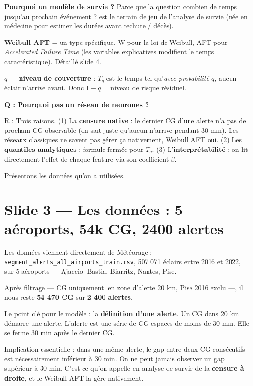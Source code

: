 \documentclass[11pt,a4paper]{article}
\begin{document}
\begin{compr}
\textbf{Pourquoi un modèle de survie ?} Parce que la question \og combien de temps jusqu'au
prochain événement ? \fg{} est le terrain de jeu de l'analyse de survie (née en médecine
pour estimer les durées avant rechute / décès).

\textbf{Weibull AFT} = un type spécifique. \og W \fg{} pour la loi de Weibull, \og AFT \fg{}
pour \textit{Accelerated Failure Time} (les variables explicatives modifient le temps
caractéristique). Détaillé slide 4.

\textbf{$q$ = niveau de couverture} : $T_q$ est le temps tel qu'\emph{avec probabilité $q$},
aucun éclair n'arrive avant. Donc $1-q$ = niveau de risque résiduel.
\end{compr}

\begin{piege}
\textbf{Q : Pourquoi pas un réseau de neurones ?}

R : Trois raisons. (1) La \textbf{censure native} : le dernier CG d'une alerte n'a pas de
prochain CG observable (on sait juste qu'aucun n'arrive pendant 30 min). Les réseaux
classiques ne savent pas gérer ça nativement, Weibull AFT oui. (2) Les \textbf{quantiles
analytiques} : formule fermée pour $T_q$. (3) L'\textbf{interprétabilité} : on lit
directement l'effet de chaque feature via son coefficient $\beta$.
\end{piege}

\begin{transit}
\og Présentons les données qu'on a utilisées. \fg{}
\end{transit}

\section{Slide 3 — Les données : 5 aéroports, 54k CG, 2400 alertes}

\begin{dire}
\og Les données viennent directement de Météorage :
\texttt{segment\_alerts\_all\_airports\_train.csv}, 507 071 éclairs entre 2016 et 2022,
sur 5 aéroports — Ajaccio, Bastia, Biarritz, Nantes, Pise.

Après filtrage — CG uniquement, en zone d'alerte 20 km, Pise 2016 exclu —, il nous reste
\textbf{54 470 CG} sur \textbf{2 400 alertes}.

Le point clé pour le modèle : la \textbf{définition d'une alerte}. Un CG dans 20 km démarre
une alerte. L'alerte est une série de CG espacés de moins de 30 min. Elle se ferme 30 min
après le dernier CG.

Implication essentielle : dans une même alerte, le gap entre deux CG consécutifs est
nécessairement inférieur à 30 min. On ne peut jamais observer un gap supérieur à 30 min.
C'est ce qu'on appelle en analyse de survie de la \textbf{censure à droite}, et le Weibull
AFT la gère nativement. \fg{}
\end{dire}
\end{document}
